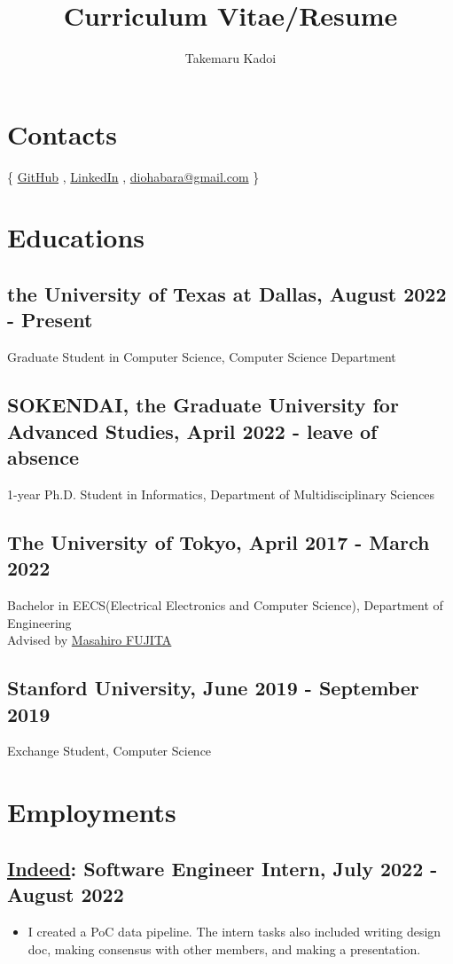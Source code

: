 \documentclass[12pt]{article}
\title{\vspace{-1cm}Curriculum Vitae/Resume}
\author{Takemaru Kadoi}
\date{}
\begin{document}

\section*{Contacts}
  \{
    \href{https://github.com/diohabara/}{GitHub}
    , \href{https://www.linkedin.com/in/takemaru-kadoi}{LinkedIn}
    , \href{mailto:diohabara@gmail.com}{diohabara@gmail.com}
  \}

\section*{Educations}
  \subsection*{the University of Texas at Dallas, August 2022 - Present}
    Graduate Student in Computer Science, Computer Science Department
  \subsection*{SOKENDAI, the Graduate University for Advanced Studies, April 2022 - leave of absence}
    1-year Ph.D. Student in Informatics, Department of Multidisciplinary Sciences
  \subsection*{The University of Tokyo, April 2017 - March 2022}
    Bachelor in EECS(Electrical Electronics and Computer Science), Department of Engineering \\
    Advised by \href{https://www.cad.t.u-tokyo.ac.jp/en/}{Masahiro FUJITA}
  \subsection*{Stanford University, June 2019 - September 2019}
    Exchange Student, Computer Science

\section*{Employments}
  \subsection*{\href{https://www.indeed.com/about}{Indeed}: Software Engineer Intern, July 2022 - August 2022}
    \begin{itemize}
      \item I created a PoC data pipeline. The intern tasks also included writing design doc, making consensus with other members, and making a presentation.
    \end{itemize}
\end{document}

